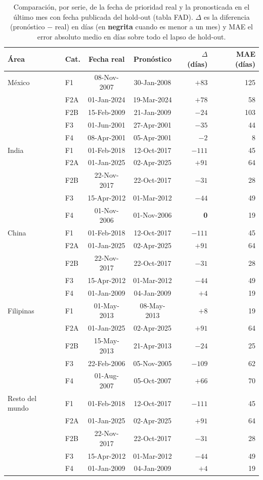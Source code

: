 \documentclass[12pt,letterpaper]{report}
\begin{document}
\begin{table}[H]
\centering
\footnotesize
\caption[Pronóstico vs.\ fecha real por categoría (FAD)]{Comparación, por serie, de la fecha
de prioridad real y la pronosticada en el último mes con fecha publicada del hold-out (tabla
FAD). $\Delta$ es la diferencia (pronóstico $-$ real) en días (en \textbf{negrita} cuando es
menor a un mes) y MAE el error absoluto medio en días sobre todo el lapso de hold-out.}
\label{tab:fcst_fad}
\begin{tabular}{llccrr}
\toprule
\rowcolor{uacjblue!15}
\textbf{Área} & \textbf{Cat.} & \textbf{Fecha real} & \textbf{Pronóstico} & \textbf{$\Delta$ (días)} & \textbf{MAE (días)} \\ \midrule
México & F1 & 08-Nov-2007 & 30-Jan-2008 & $+83$ & 125 \\
 & F2A & 01-Jan-2024 & 19-Mar-2024 & $+78$ & 58 \\
 & F2B & 15-Feb-2009 & 21-Jan-2009 & \textbf{$-24$} & 103 \\
 & F3 & 01-Jun-2001 & 27-Apr-2001 & $-35$ & 44 \\
 & F4 & 08-Apr-2001 & 05-Apr-2001 & \textbf{$-2$} & 8 \\
India & F1 & 01-Feb-2018 & 12-Oct-2017 & $-111$ & 45 \\
 & F2A & 01-Jan-2025 & 02-Apr-2025 & $+91$ & 64 \\
 & F2B & 22-Nov-2017 & 22-Oct-2017 & $-31$ & 28 \\
 & F3 & 15-Apr-2012 & 01-Mar-2012 & $-44$ & 49 \\
 & F4 & 01-Nov-2006 & 01-Nov-2006 & \textbf{0} & 19 \\
China & F1 & 01-Feb-2018 & 12-Oct-2017 & $-111$ & 45 \\
 & F2A & 01-Jan-2025 & 02-Apr-2025 & $+91$ & 64 \\
 & F2B & 22-Nov-2017 & 22-Oct-2017 & $-31$ & 28 \\
 & F3 & 15-Apr-2012 & 01-Mar-2012 & $-44$ & 49 \\
 & F4 & 01-Jan-2009 & 04-Jan-2009 & \textbf{$+4$} & 19 \\
Filipinas & F1 & 01-May-2013 & 08-May-2013 & \textbf{$+8$} & 19 \\
 & F2A & 01-Jan-2025 & 02-Apr-2025 & $+91$ & 64 \\
 & F2B & 15-May-2013 & 21-Apr-2013 & \textbf{$-24$} & 25 \\
 & F3 & 22-Feb-2006 & 05-Nov-2005 & $-109$ & 62 \\
 & F4 & 01-Aug-2007 & 05-Oct-2007 & $+66$ & 70 \\
Resto del mundo & F1 & 01-Feb-2018 & 12-Oct-2017 & $-111$ & 45 \\
 & F2A & 01-Jan-2025 & 02-Apr-2025 & $+91$ & 64 \\
 & F2B & 22-Nov-2017 & 22-Oct-2017 & $-31$ & 28 \\
 & F3 & 15-Apr-2012 & 01-Mar-2012 & $-44$ & 49 \\
 & F4 & 01-Jan-2009 & 04-Jan-2009 & \textbf{$+4$} & 19 \\
\bottomrule
\end{tabular}
\end{table}
\end{document}
